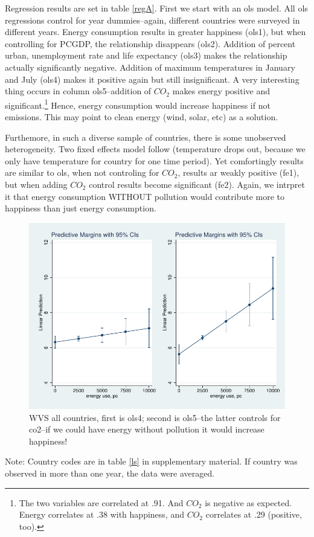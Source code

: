 \documentclass[10pt, letterpaper]{article}
\begin{document}
\begin{spacing}{1.4}
Regression results are set in table \ref{regA}. First we start with an ols
model. All ols regressions control for year dummies--again, different countries
were surveyed in different years. Energy consumption results in greater
happiness (ols1), but when controlling for PCGDP, the relationship disappears
(ols2). Addition of percent urban, unemployment rate and life expectancy (ols3)
makes the relationship actually significantly negative.  Addition of maximum
temperatures in January and July (ols4) makes it positive again but still
insignificant.  A very interesting thing occurs in column ols5--addition of
$CO_2$ makes energy positive and significant.\footnote{The two variables are
  correlated at .91. And $CO_2$ is negative as expected. Energy correlates at .38
  with happiness, and $CO_2$ correlates at .29 (positive, too).}
 Hence, energy consumption would increase happiness if not emissions. This may
 point to clean energy (wind, solar, etc) as a solution. 

Furthemore, in such a diverse sample of countries, there is some unobserved
heterogeneity. Two fixed effects model follow (temperature drops out, because we
 only have temperature for country for one time period). Yet comfortingly
 results are similar to ols, when not controling for $CO_2$, results ar weakly
 positive (fe1), but when adding $CO_2$ control results become significant
 (fe2). Again, we intrpret it  that energy consumption WITHOUT pollution would
 contribute more to happiness than just energy consumption.  

\begin{figure}[H]
 \includegraphics[width=6in]{graphsAndTables/ols4ols5.pdf}\centering
\caption{WVS all countries, first is ols4; second is ols5--the latter controls
  for co2--if we could have energy without pollution it would increase happiness! }\label{ols4ols5}
\end{figure}
{\scriptsize Note: Country codes are in table \ref{ls} in supplementary
  material. If country was observed in more than one year, the data were averaged.}



\end{spacing}
\end{document}
